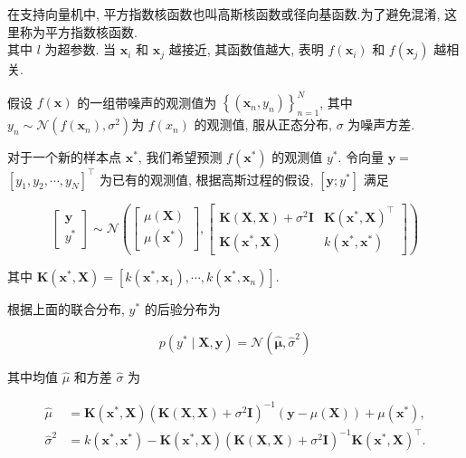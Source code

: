 \documentclass[10pt]{article}
\begin{document}
在支持向量机中, 平方指数核函数也叫高斯核函数或径向基函数.为了避免混淆, 这里称为平方指数核函数.\\
其中 $l$ 为超参数. 当 $\boldsymbol{x}_{i}$ 和 $\boldsymbol{x}_{j}$ 越接近, 其函数值越大, 表明 $f\left(\boldsymbol{x}_{i}\right)$ 和 $f\left(\boldsymbol{x}_{j}\right)$ 越相关.

假设 $f(\boldsymbol{x})$ 的一组带噪声的观测值为 $\left\{\left(\boldsymbol{x}_{n}, y_{n}\right)\right\}_{n=1}^{N}$, 其中 $y_{n} \sim \mathcal{N}\left(f\left(\boldsymbol{x}_{n}\right), \sigma^{2}\right)$为 $f\left(x_{n}\right)$ 的观测值, 服从正态分布, $\sigma$ 为噪声方差.

对于一个新的样本点 $\boldsymbol{x}^{*}$, 我们希望预测 $f\left(\boldsymbol{x}^{*}\right)$ 的观测值 $y^{*}$. 令向量 $\boldsymbol{y}=$ $\left[y_{1}, y_{2}, \cdots, y_{N}\right]^{\top}$ 为已有的观测值, 根据高斯过程的假设, $\left[\boldsymbol{y} ; y^{*}\right]$ 满足

\[
\left[\begin{array}{l}
\boldsymbol{y}  \tag{D.52}\\
y^{*}
\end{array}\right] \sim \mathcal{N}\left(\left[\begin{array}{l}
\mu(\boldsymbol{X}) \\
\mu\left(\boldsymbol{x}^{*}\right)
\end{array}\right],\left[\begin{array}{cc}
\boldsymbol{K}(\boldsymbol{X}, \boldsymbol{X})+\sigma^{2} \boldsymbol{I} & \boldsymbol{K}\left(\boldsymbol{x}^{*}, \boldsymbol{X}\right)^{\top} \\
\boldsymbol{K}\left(\boldsymbol{x}^{*}, \boldsymbol{X}\right) & k\left(\boldsymbol{x}^{*}, \boldsymbol{x}^{*}\right)
\end{array}\right]\right)
\]

其中 $\boldsymbol{K}\left(\boldsymbol{x}^{*}, \boldsymbol{X}\right)=\left[k\left(\boldsymbol{x}^{*}, \boldsymbol{x}_{1}\right), \cdots, k\left(\boldsymbol{x}^{*}, \boldsymbol{x}_{n}\right)\right]$.

根据上面的联合分布, $y^{*}$ 的后验分布为


\begin{equation*}
p\left(y^{*} \mid \boldsymbol{X}, \boldsymbol{y}\right)=\mathcal{N}\left(\hat{\boldsymbol{\mu}}, \hat{\sigma}^{2}\right) \tag{D.53}
\end{equation*}


其中均值 $\hat{\mu}$ 和方差 $\hat{\sigma}$ 为


\begin{align*}
\hat{\mu} & =\boldsymbol{K}\left(\boldsymbol{x}^{*}, \boldsymbol{X}\right)\left(\boldsymbol{K}(\boldsymbol{X}, \boldsymbol{X})+\sigma^{2} \boldsymbol{I}\right)^{-1}(\boldsymbol{y}-\mu(\boldsymbol{X}))+\mu\left(\boldsymbol{x}^{*}\right),  \tag{D.54}\\
\hat{\sigma}^{2} & =k\left(\boldsymbol{x}^{*}, \boldsymbol{x}^{*}\right)-\boldsymbol{K}\left(\boldsymbol{x}^{*}, \boldsymbol{X}\right)\left(\boldsymbol{K}(\boldsymbol{X}, \boldsymbol{X})+\sigma^{2} \boldsymbol{I}\right)^{-1} \boldsymbol{K}\left(\boldsymbol{x}^{*}, \boldsymbol{X}\right)^{\top} . \tag{D.55}
\end{align*}
\end{document}
